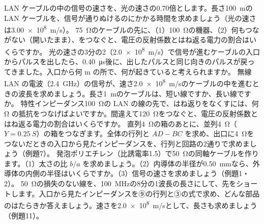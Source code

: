 \bkendproblems
{}
\bkproblem LAN ケーブルの中の信号の速さを、光の速さの0.70倍とします。長さ\qty{100}{m}の LAN ケーブルを、信号が通りぬけるのにかかる時間を求めましょう（光の速さは\qty{3.00e8}{m/s}）。
\bkproblem \qty{75}{\ohm}のケーブルの先に、（1）\qty{100}{\ohm}の機器、（2）何もつながない（開いたまま）、をつなぐと、電圧の反射係数とはね返る電力の割合はいくらですか。
\bkproblem 光の速さの3分の2（\qty{2.0e8}{m/s}）で信号が進むケーブルの入口からパルスを出したら、\qty{0.40}{\micro s}後に、出したパルスと同じ向きのパルスが戻ってきました。入口から何 m の所で、何が起きていると考えられますか。
\bkproblem 無線 LAN の電波（\qty{2.4}{GHz}）の信号が、速さ\qty{2.0e8}{m/s}のケーブルの中を進むときの波長を求めましょう。長さ\qty{1}{m}のケーブルは、短い線ですか、長い線ですか。
\bkproblem 特性インピーダンス\qty{100}{\ohm}の LAN の線の先で、はね返りをなくすには、何 Ω の抵抗をつなげばよいですか。間違えて\qty{120}{\ohm}をつなぐと、電圧の反射係数とはね返る電力の割合はいくらですか。
\bkproblem 直列\qty{4}{\ohm}の箱のあとに、並列\qty{4}{\ohm}（$Y=\qty{0.25}{S}$）の箱をつなぎます。全体の行列と $AD-BC$ を求め、出口に\qty{4}{\ohm}をつないだときの入口から見たインピーダンスを、行列と回路の2通りで求めましょう（例題7）。
\bkproblem 発泡ポリエチレン（比誘電率1.5）で\qty{50}{\ohm}の同軸ケーブルを作ります。（1）太さの比 $b/a$ を求めましょう。（2）内導体の半径が\qty{0.50}{mm}なら、外導体の内側の半径はいくらですか。（3）信号の速さを求めましょう（例題1・2）。
\bkproblem \qty{50}{\ohm}の損失のない線を、\qty{100}{MHz}の8分の1波長の長さにして、先をショートします。入口から見たインピーダンスを⑨の行列と③の式で求め、どんな部品のはたらきか答えましょう。速さを\qty{2.0e8}{m/s}として、長さも求めましょう（例題11）。

